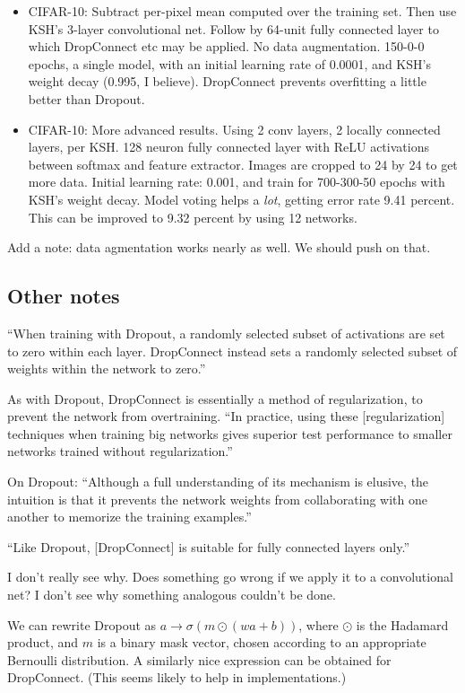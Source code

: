 \documentclass[12pt]{report}
\begin{document}
\begin{itemize}
\item CIFAR-10: Subtract per-pixel mean computed over the training
  set.  Then use KSH's 3-layer convolutional net.  Follow by 64-unit
  fully connected layer to which DropConnect etc may be applied.  No
  data augmentation. 150-0-0 epochs, a single model, with an initial
  learning rate of 0.0001, and KSH's weight decay (0.995, I believe).
  DropConnect prevents overfitting a little better than Dropout.

\item CIFAR-10: More advanced results.  Using 2 conv layers, 2 locally
  connected layers, per KSH.  128 neuron fully connected layer with
  ReLU activations between softmax and feature extractor.  Images are
  cropped to 24 by 24 to get more data.  Initial learning rate: 0.001,
  and train for 700-300-50 epochs with KSH's weight decay.  Model
  voting helps a \emph{lot}, getting error rate 9.41 percent.  This
  can be improved to 9.32 percent by using 12 networks.

\end{itemize}

Add a note: data agmentation works nearly as well.  We should push on that.

\subsection{Other notes}

``When training with Dropout, a randomly selected subset of
activations are set to zero within each layer.  DropConnect instead
sets a randomly selected subset of weights within the network to
zero.''

As with Dropout, DropConnect is essentially a method of
regularization, to prevent the network from overtraining.  ``In
practice, using these [regularization] techniques when training big
networks gives superior test performance to smaller networks trained
without regularization.''

On Dropout: ``Although a full understanding of its mechanism is
elusive, the intuition is that it prevents the network weights from
collaborating with one another to memorize the training examples.''

``Like Dropout, [DropConnect] is suitable for fully connected layers only.''

I don't really see why.  Does something go wrong if we apply it to a
convolutional net?  I don't see why something analogous couldn't be
done.

We can rewrite Dropout as $a \rightarrow \sigma(m \odot (wa+b))$,
where $\odot$ is the Hadamard product, and $m$ is a binary mask
vector, chosen according to an appropriate Bernoulli distribution.  A
similarly nice expression can be obtained for DropConnect.  (This
seems likely to help in implementations.)
\end{document}
